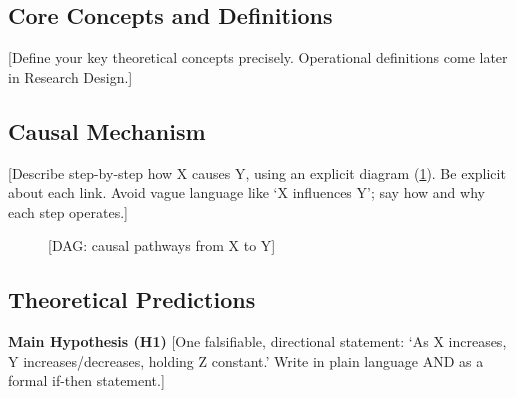 \documentclass[12pt,a4paper]{article}
\begin{document}
\subsection{Core Concepts and Definitions} %
[Define your key theoretical concepts precisely. Operational definitions come later in Research Design.]

\subsection{Causal Mechanism} %
[Describe step-by-step how X causes Y, using an explicit diagram (\cref{fig:dag}). Be explicit about each link. Avoid vague language like `X influences Y'; say how and why each step operates.]

\begin{figure}[htbp]
    \centering
    \footnotesize
    \caption{[DAG: causal pathways from X to Y]}
    \label{fig:dag}
\end{figure}

\subsection{Theoretical Predictions} %

\textbf{Main Hypothesis (H1)}
[One falsifiable, directional statement: `As X increases, Y increases/decreases, holding Z constant.' Write in plain language AND as a formal if-then statement.]
\end{document}
